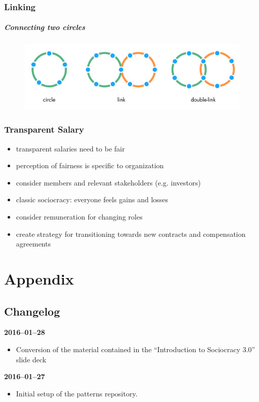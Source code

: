 \section{Linking}
\label{linking}

\subsubsection{Connecting two circles}
\label{connectingtwocircles}

\begin{figure}[htbp]
\centering
\includegraphics[keepaspectratio,width=\textwidth,height=0.75\textheight]{img/structural-patterns/circles-and-links.png}
\end{figure}

\section{Transparent Salary}
\label{transparentsalary}

\begin{itemize}
\item transparent salaries need to be fair

\item perception of fairness is specific to organization

\item consider members and relevant stakeholders (e.g. investors)

\item classic sociocracy: everyone feels gains and losses

\item consider remuneration for changing roles

\item create strategy for transitioning towards new contracts and compensation agreements

\end{itemize}

\part{Appendix}
\label{appendix}

\chapter{Changelog}
\label{changelog}

\textbf{2016--01--28}

\begin{itemize}
\item Conversion of the material contained in the ``Introduction to Sociocracy 3.0'' slide deck

\end{itemize}

\textbf{2016--01--27}

\begin{itemize}
\item Initial setup of the patterns repository.

\end{itemize}
